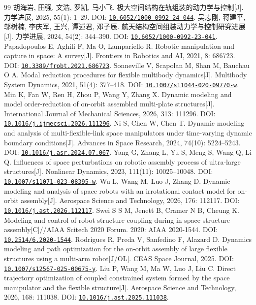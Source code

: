 \documentclass[UTF8,a4paper,zihao=-4,fontset=fandol]{ctexart}
\newcommand{\doi}[1]{\href{https://doi.org/#1}{\nolinkurl{#1}}}
\begin{document}
\renewcommand{\refname}{主要参考文献}
\begin{thebibliography}{99}
\setlength{\itemsep}{0.15em}
 胡海岩, 田强, 文浩, 罗凯, 马小飞. 极大空间结构在轨组装的动力学与控制[J]. 力学进展, 2025, 55(1): 1--29. DOI: \doi{10.6052/1000-0992-24-044}.
 吴志刚, 蒋建平, 邬树楠, 李庆军, 王兴, 谭述君, 邓子辰. 航天结构空间组装动力学与控制研究进展[J]. 力学进展, 2024, 54(2): 344--390. DOI: \doi{10.6052/1000-0992-23-041}.
 Papadopoulos E, Aghili F, Ma O, Lampariello R. Robotic manipulation and capture in space: A survey[J]. Frontiers in Robotics and AI, 2021, 8: 686723. DOI: \doi{10.3389/frobt.2021.686723}.
 Sonneville V, Scapolan M, Shan M, Bauchau O A. Modal reduction procedures for flexible multibody dynamics[J]. Multibody System Dynamics, 2021, 51(4): 377--418. DOI: \doi{10.1007/s11044-020-09770-w}.
 Min K, Fan W, Ren H, Zhou P, Wang Y, Zhang X. Dynamic modeling and model order-reduction of on-orbit assembled multi-plate structures[J]. International Journal of Mechanical Sciences, 2026, 313: 111296. DOI: \doi{10.1016/j.ijmecsci.2026.111296}.
 Ni S, Chen W, Chen T. Dynamic modeling and analysis of multi-flexible-link space manipulators under time-varying dynamic boundary conditions[J]. Advances in Space Research, 2024, 74(10): 5224--5243. DOI: \doi{10.1016/j.asr.2024.07.067}.
 Yang G, Zhang L, Yu S, Meng S, Wang Q, Li Q. Influences of space perturbations on robotic assembly process of ultra-large structures[J]. Nonlinear Dynamics, 2023, 111(11): 10025--10048. DOI: \doi{10.1007/s11071-023-08395-w}.
 Wu L, Wang M, Luo J, Zhang D. Dynamic modeling and analysis of space robots with an irrotational contact model for on-orbit assembly[J]. Aerospace Science and Technology, 2026, 176: 112117. DOI: \doi{10.1016/j.ast.2026.112117}.
 Swei S S M, Jenett B, Cramer N B, Cheung K. Modeling and control of robot-structure coupling during in-space structure assembly[C]//AIAA Scitech 2020 Forum. 2020: AIAA 2020-1544. DOI: \doi{10.2514/6.2020-1544}.
 Rodrigues R, Preda V, Sanfedino F, Alazard D. Dynamics modeling and path optimization for the on-orbit assembly of large flexible structures using a multi-arm robot[J/OL]. CEAS Space Journal, 2025. DOI: \doi{10.1007/s12567-025-00675-y}.
 Liu P, Wang M, Ma W, Luo J, Liu C. Direct trajectory optimization of coupled constrained system formed by the space manipulator and the flexible structure[J]. Aerospace Science and Technology, 2026, 168: 111038. DOI: \doi{10.1016/j.ast.2025.111038}.

\end{thebibliography}
\end{document}
